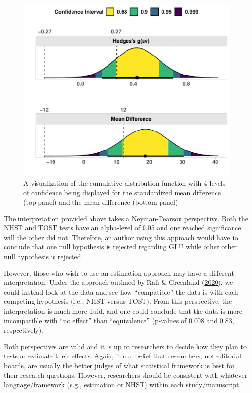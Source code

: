 \documentclass[]{cik}%
\begin{document}
\begin{figure}
\centering
\includegraphics{tenan_arc_manuscript_files/figure-latex/unnamed-chunk-2-1.pdf}
\caption{A visualization of the cumulative distribution function with 4
levels of confidence being displayed for the standardized mean
difference (top panel) and the mean difference (bottom panel)}
\end{figure}

The interpretation provided above takes a Neyman-Pearson perspective.
Both the NHST and TOST tests have an alpha-level of 0.05 and one reached
significance will the other did not. Therefore, an author using this
approach would have to conclude that one null hypothesis is rejected
regarding GLU while other other null hypothesis is rejected.

However, those who wish to use an estimation approach may have a
different interpretation. Under the approach outlined by Rafi \&
Greenland (\protect\hyperlink{ref-rafi2020}{2020}), we could instead
look at the data and see how ``compatible'' the data is with each
competing hypothesis (i.e., NHST versus TOST). From this perspective,
the interpretation is much more fluid, and one could conclude that the
data is more incompatible with ``no effect'' than ``equivalence''
(p-values of 0.008 and 0.83, respectively).

Both perspectives are valid and it is up to researchers to decide how
they plan to tests or estimate their effects. Again, it our belief that
researchers, not editorial boards, are usually the better judges of what
statistical framework is best for their research questions. However,
researchers should be consistent with whatever language/framework (e.g.,
estimation or NHST) within each study/manuscript.
\end{document}
